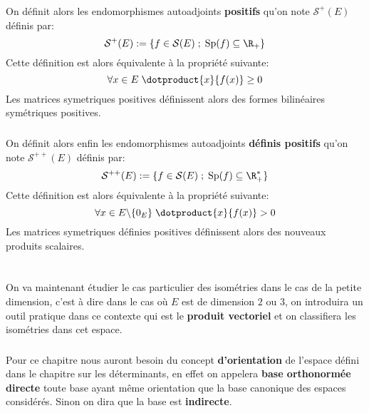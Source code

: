 \subsection*{}
On définit alors les endomorphismes autoadjoints \textbf{positifs} qu'on note \(\mathcal{S}^+(E)\) définis par:
\[
   \mathcal{S}^+(E) := \{ f \in \mathcal{S}(E) \; ; \; \text{Sp}(f) \subseteq \R_+ \}  
\]
Cette définition est alors équivalente à la propriété suivante:
\[
   \forall x \in E \; \dotproduct{x}{f(x)} \geq 0
\]
Les matrices symetriques positives définissent alors des formes bilinéaires symétriques positives.
\subsection*{}
On définit alors enfin les endomorphismes autoadjoints \textbf{définis positifs} qu'on note \(\mathcal{S}^{++}(E)\) définis par:
\[
   \mathcal{S}^{++}(E) := \{ f \in \mathcal{S}(E) \; ; \; \text{Sp}(f) \subseteq \R_+^* \}  
\]
Cette définition est alors équivalente à la propriété suivante:
\[
   \forall x \in E\backslash\{0_E\} \; \dotproduct{x}{f(x)} > 0 
\]
Les matrices symetriques définies positives définissent alors des nouveaux produits scalaires.

\chapter*{}
On va maintenant étudier le cas particulier des isométries dans le cas de la petite dimension, c'est à dire dans le cas où \(E\) est de dimension \(2\) ou \(3\), on introduira un outil pratique dans ce contexte qui est le \textbf{produit vectoriel} et on classifiera les isométries dans cet espace.

\subsection*{}
Pour ce chapitre nous auront besoin du concept \textbf{d'orientation} de l'espace défini dans le chapitre sur les déterminants, en effet on appelera \textbf{base orthonormée directe} toute base ayant même orientation que la base canonique des espaces considérés. Sinon on dira que la base est \textbf{indirecte}.

